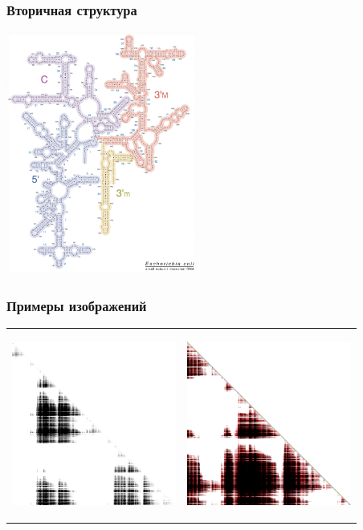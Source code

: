 \documentclass{beamer}
\begin{document}
\begin{frame}[fragile]
\transwipe[direction=90]
\frametitle{Вторичная структура}
  
   \begin{center}
      \includegraphics[height=8cm]{pictures/ecoli_16s.jpg}
    \end{center}
  
\end{frame}


\begin{frame}[fragile]
\transwipe[direction=90]
\frametitle{Примеры изображений}
  \begin{tabular}{p{6cm} p{6cm}}
   \begin{center}
      \includegraphics[height=5.4cm]{pictures/bw.png}
    \end{center}
    &
    \begin{center}
      \includegraphics[height=5.4cm]{pictures/colored.png}
    \end{center}
  \end{tabular}
\end{frame}
      
\end{document}
